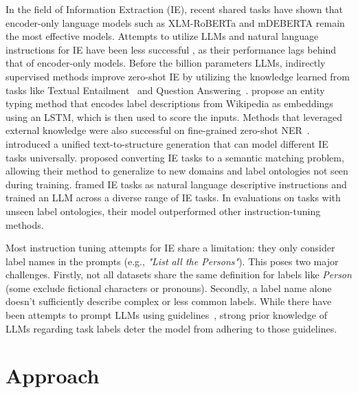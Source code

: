 In the field of Information Extraction (IE), recent shared tasks \citep{DBLP:conf/semeval/FetahuKCRM23} have shown that encoder-only language models such as XLM-RoBERTa \citep{DBLP:conf/acl/ConneauKGCWGGOZ20} and mDEBERTA \citep{DBLP:conf/iclr/HeGC23} remain the most effective models. Attempts to utilize LLMs and natural language instructions for IE have been less successful \citep{DBLP:conf/semeval/TanHJCL0ZTXH23,DBLP:journals/corr/abs-2308-03279,DBLP:journals/corr/abs-2305-12217}, as their performance lags behind that of encoder-only models. 
Before the billion parameters LLMs, indirectly supervised methods improve zero-shot IE by utilizing the knowledge learned from tasks like Textual Entailment~\citep{sainz-etal-2021-label, sainz-etal-2022-textual, sainz-etal-2022-zs4ie} and Question Answering~\citep{levy-etal-2017-zero}.
\cite{obeidat-etal-2019-description} propose an entity typing method that encodes label descriptions from Wikipedia as embeddings using an LSTM, which is then used to score the inputs. Methods that leveraged external knowledge were also successful on fine-grained zero-shot NER~\citep{chen-etal-2021-empirical}.
\cite{DBLP:conf/acl/0001LDXLHSW22} introduced a unified text-to-structure generation that can model different IE tasks universally. \cite{DBLP:conf/aaai/Lou0DJLH0023} proposed converting IE tasks to a semantic matching problem, allowing their method to generalize  to new domains and label ontologies not seen during training. \cite{DBLP:journals/corr/abs-2304-08085} framed IE tasks as natural language descriptive instructions and trained an LLM across a diverse range of IE tasks. In evaluations on tasks with unseen label ontologies, their model outperformed other instruction-tuning methods. 

Most instruction tuning attempts for IE share a limitation: they only consider label names in the prompts (e.g., \textit{"List all the Persons"}). This poses two major challenges. Firstly, not all datasets share the same definition for labels like \textit{Person} (some exclude fictional characters or pronouns). Secondly, a label name alone doesn't sufficiently describe complex or less common labels. While there have been attempts to prompt LLMs using guidelines~\citep{DBLP:journals/corr/abs-2305-12217}, strong prior knowledge of LLMs regarding task labels \citep{DBLP:conf/acl/BlevinsGZ23} deter the model from adhering to those guidelines. 

\section{Approach}

